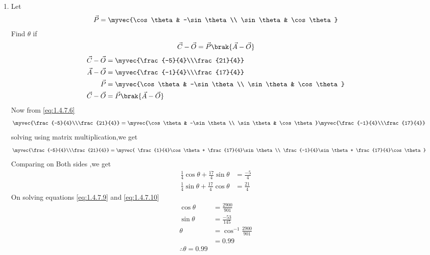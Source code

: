 \documentclass[11pt]{book}
\begin{document}
\begin{enumerate}[label=\thesection.\arabic*.,ref=\thesection.\theenumi]
\item Let 
\begin{align}
\vec{P} = \myvec{\cos \theta & -\sin \theta \\ \sin \theta & \cos \theta}
\end{align}
Find $\theta$ if 
\begin{align}
\vec{C}-\vec{O}=\vec{P}\brak{\vec{A}-\vec{O}}
\end{align}
\solution
\begin{align}
    \vec{C}-\vec{O}
          & =\myvec{\frac{-5}{4}\\\frac{21}{4}}\\
\vec{A}-\vec{O}
         & =\myvec{\frac{-1}{4}\\\frac{17}{4}}
	  \\
\vec{P} &= \myvec{\cos \theta & -\sin \theta \\ \sin \theta & \cos \theta} \\
   \vec{C}-\vec{O}&=\vec{P}\brak{\vec{A}-\vec{O}} \label{eq:1.4.7.6}
\end{align}
 Now from \eqref{eq:1.4.7.6}
 \begin{align}
 \myvec{\frac{-5}{4}\\\frac{21}{4}}&= \myvec{\cos \theta & -\sin \theta \\ \sin \theta & \cos \theta} \myvec{\frac{-1}{4}\\\frac{17}{4}}    
 \end{align}
solving using matrix multiplication,we get
\begin{align}
    \myvec{\frac{-5}{4}\\\frac{21}{4}}&=\myvec{ \frac{1}{4}\cos\theta + \frac{17}{4}\sin\theta \\ \frac{-1}{4}\sin\theta + \frac{17}{4}\cos\theta}
\end{align}
Comparing on Both sides ,we get
\begin{align}
     \frac{1}{4}\cos\theta + \frac{17}{4}\sin\theta &= \frac{-5}{4}  \label{eq:1.4.7.9}\\
 \frac{1}{4}\sin\theta + \frac{17}{4}\cos\theta &= \frac{21}{4} \label{eq:1.4.7.10}
\end{align}
On solving equations \eqref{eq:1.4.7.9}  and \eqref{eq:1.4.7.10}
\begin{align}
    \cos\theta&= \frac{2900}{901} \\
    \sin\theta&= \frac{-53}{145} \\
    \theta &=\cos^{-1}\frac{2900}{901} \\
            &= 0.99 \\
            \therefore \theta = 0.99
\end{align}
\end{enumerate}
\end{document}
